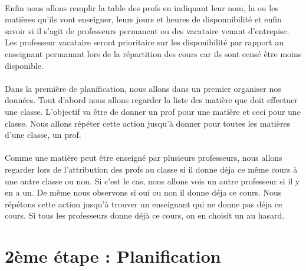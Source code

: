 \documentclass[12]{article}
\begin{document}
		\paragraph{}
		Enfin nous allons remplir la table des profs en indiquant leur nom, la ou les matières qu'ils vont enseigner, leurs jours et heures de disponnibilité et enfin savoir si il s'agit de professeurs permanent ou des vacataire venant d'entrepise. Les professeur vacataire seront prioritaire sur les disponibilité par rapport au enseignant permanant lors de la répartition des cours car ils sont censé être moins disponible.

		\paragraph{}
		Dans la première de planification, nous allons dans un premier organiser nos données.	 
Tout d'abord nous allons regarder la liste des matière que doit effectuer une classe. L'objectif va être de donner un prof pour une matière et ceci pour une classe. Nous allons répéter cette action jusqu'à donner pour toutes les matières d'une classe, un prof.
		
		\paragraph{}
		Comme une matière peut être enseigné par plusieurs professeurs, nous allons regarder lors de l'attribution des profs au classe si il donne déja ce même cours à une autre classe ou non. Si c'est le cas, nous allons vois un autre professeur si il y en a un. De même nous observons si oui ou non il donne déja ce cours. Nous répétons cette action jusqu'à trouver un enseignant qui ne donne pas déja ce cours. Si tous les professeurs donne déjà ce cours, on en choisit un au hasard.



	\section*{2ème étape : Planification}
		
\end{document}
